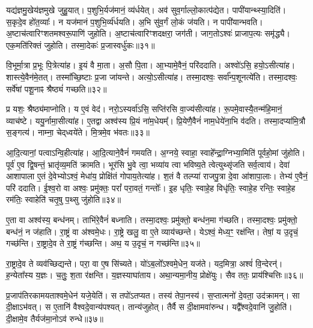 यद्य॑ज्ञमु॒खेय॑ज्ञमुखे जुहु॒यात्।
प॒शुभि॒र्यज॑मानं॒ व्य॑र्धयेत्।
अव॑ सुव॒र्गाल्लो॒कात्प॑द्येत।
पापी॑यान्थ्स्या॒दिति॑।
स॒कृदे॒व हो॑त॒व्याः᳚।
न यज॑मानं प॒शुभि॒र्व्य॑र्धयति।
अ॒भि सु॑व॒र्गं लो॒कं ज॑यति।
न पापी॑यान्भवति।
अ॒ष्टाच॑त्वारिꣳशतमश्वरू॒पाणि॑ जुहोति।
अ॒ष्टाच॑त्वारिꣳशदक्षरा॒ जग॑ती।
जाग॒तो\-ऽश्वः॑ प्राजाप॒त्यः समृ॑द्ध्यै।
एक॒मति॑रिक्तं जुहोति।
तस्मा॒देकः॑ प्र॒जास्वर्धु॑कः॥३१॥\anuvakamend[अ॒र्ध॒य॒ति॒ ज॒न॒य॒ति॒ खल्वा॑हु॒र्जग॑ती॒ त्रीणि॑ च]

वि॒भूर्मा॒त्रा प्र॒भूः पि॒त्रेत्या॑ह।
इ॒यं वै मा॒ता।
अ॒सौ पि॒ता।
आ॒भ्यामे॒वैनं॒ परि॑ददाति।
अश्वो॑ऽसि॒ हयो॒\-ऽसीत्या॑ह।
शास्त्ये॒वैन॑मे॒तत्।
तस्मा᳚च्छि॒ष्टाः प्र॒जा जा॑यन्ते।
अत्यो॒\-ऽसीत्या॑ह।
तस्मा॒दश्वः॒ सर्वा᳚न्प॒शूनत्ये॑ति।
तस्मा॒दश्वः॒ सर्वे॑षां पशू॒नाꣴ श्रैष्ठ्यं॑ गच्छति॥३२॥

प्र यशः॒ श्रैष्ठ्य॑माप्नोति।
य ए॒वं वेद॑।
नरो॒ऽस्यर्वा॑ऽसि॒ सप्ति॑रसि वा॒ज्य॑सीत्या॑ह।
रू॒पमे॒वास्यै॒तन्म॑हि॒मानं॒ व्याच॑ष्टे।
ययु॒र्नामा॒सीत्या॑ह।
ए॒तद्वा अश्व॑स्य प्रि॒यं ना॑म॒धेयम्᳚।
प्रि॒येणै॒वैनं॑ नाम॒धेये॑ना॒भि व॑दति।
तस्मा॒दप्या॑मि॒त्रौ स॒ङ्गत्य॑।
नाम्ना॒ चेद्‌ध्वये॑ते।
मि॒त्रमे॒व भ॑वतः॥३३॥

आ॒दि॒त्यानां॒ पत्वा\-ऽन्वि॒हीत्या॑ह।
आ॒दि॒त्याने॒वैनं॑ गमयति।
अ॒ग्नये॒ स्वाहा॒ स्वाहे᳚न्द्रा॒ग्निभ्या॒मिति॑ पूर्वहो॒मां जु॑होति।
पूर्व॑ ए॒व द्वि॒षन्तं॒ भ्रातृ॑व्य॒मति॑ क्रामति।
भूर॑सि भु॒वे त्वा॒ भव्या॑य त्वा भविष्य॒ते त्वेत्युथ्सृ॑जति सर्व॒त्वाय॑।
देवा॑ आशापाला ए॒तं दे॒वेभ्यो\-ऽश्वं॒ मेधा॑य॒ प्रोक्षि॑तं गोपाय॒तेत्या॑ह।
श॒तं वै तल्प्या॑ राजपु॒त्रा दे॒वा आ॑शापा॒लाः।
तेभ्य॑ ए॒वैनं॒ परि॑ ददाति।
ई॒श्व॒रो वा अश्वः॒ प्रमु॑क्तः॒ परां᳚ परा॒वतं॒ गन्तोः᳚।
इ॒ह धृतिः॒ स्वाहे॒ह विधृ॑तिः॒ स्वाहे॒ह रन्तिः॒ स्वाहे॒ह रम॑तिः॒ स्वाहेति॑ चतृ॒षु प॒थ्सु जु॑होति॥३४॥

ए॒ता वा अश्व॑स्य॒ बन्ध॑नम्।
ताभि॑रे॒वैनं॑ बध्नाति।
तस्मा॒दश्वः॒ प्रमु॑क्तो॒ बन्ध॑न॒मा ग॑च्छति।
तस्मा॒दश्वः॒ प्रमु॑क्तो॒ बन्ध॑नं॒ न ज॑हाति।
रा॒ष्ट्रं वा अ॑श्वमे॒धः।
रा॒ष्ट्रे खलु॒ वा ए॒ते व्याय॑च्छन्ते।
येऽश्वं॒ मेध्य॒ꣳ॒ रक्ष॑न्ति।
तेषां॒ य उ॒दृचं॒ गच्छ॑न्ति।
रा॒ष्ट्रादे॒व ते रा॒ष्ट्रं ग॑च्छन्ति।
अथ॒ य उ॒दृचं॒ न गच्छ॑न्ति॥३५॥

रा॒ष्ट्रादे॒व ते व्यव॑च्छिद्यन्ते।
परा॒ वा ए॒ष सि॑च्यते।
यो॑ऽब॒लो᳚\-ऽश्वमे॒धेन॒ यज॑ते।
यद॒मित्रा॒ अश्वं॑ वि॒न्देरन्॑।
ह॒न्येता᳚स्य य॒ज्ञः।
च॒तुः॒ श॒ता र॑क्षन्ति।
य॒ज्ञस्याघा॑ताय।
अथा॒न्यमा॒नीय॒ प्रोक्षे॑युः।
सैव ततः॒ प्राय॑श्चित्तिः॥३६॥\anuvakamend[ग॒च्छ॒ति॒ भ॒व॒तः॒ प॒थ्सु जु॑होति॒ न गच्छ॑न्ति॒ नव॑ च]

प्र॒जा\-प॑तिरकामयताश्वमे॒धेन॑ यजे॒येति॑।
स तपो॑\-ऽतप्यत।
तस्य॑ तेपा॒नस्य॑।
स॒प्तात्मनो॑ दे॒वता॒ उद॑क्रामन्।
सा दी॒क्षा\-ऽभ॑वत्।
स ए॒तानि॑ वैश्वदे॒वान्य॑पश्यत्।
तान्य॑जुहोत्।
तैर्वै स दी॒क्षामवा॑रुन्ध।
यद्वै᳚श्वदे॒वानि॑ जु॒होति॑।
दी॒क्षामे॒व तैर्यज॑मा॒नोऽव॑ रुन्धे॥३७॥

